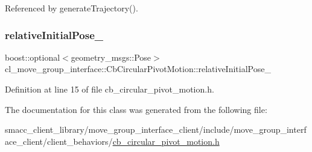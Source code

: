 Referenced by generate\+Trajectory().

\mbox{\label{classcl__move__group__interface_1_1CbCircularPivotMotion_a1b2cc65d2f27a4dec54c20f1f00d4bb8}} 
\subsubsection{\texorpdfstring{relative\+Initial\+Pose\+\_\+}{relativeInitialPose\_}}
{\footnotesize\ttfamily boost\+::optional$<$geometry\+\_\+msgs\+::\+Pose$>$ cl\+\_\+move\+\_\+group\+\_\+interface\+::\+Cb\+Circular\+Pivot\+Motion\+::relative\+Initial\+Pose\+\_\+}



Definition at line 15 of file cb\+\_\+circular\+\_\+pivot\+\_\+motion.\+h.



The documentation for this class was generated from the following file\+:\begin{DoxyCompactItemize}
\item 
smacc\+\_\+client\+\_\+library/move\+\_\+group\+\_\+interface\+\_\+client/include/move\+\_\+group\+\_\+interface\+\_\+client/client\+\_\+behaviors/\hyperlink{cb__circular__pivot__motion_8h}{cb\+\_\+circular\+\_\+pivot\+\_\+motion.\+h}\end{DoxyCompactItemize}
